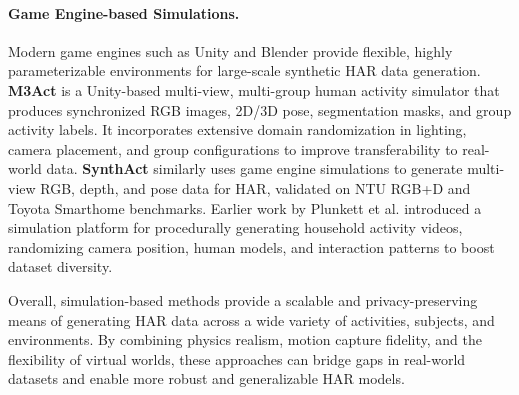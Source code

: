 \paragraph{Game Engine-based Simulations.}
Modern game engines such as Unity and Blender provide flexible, highly parameterizable environments for large-scale synthetic HAR data generation. \textbf{M3Act} \cite{chakma2023domain} is a Unity-based multi-view, multi-group human activity simulator that produces synchronized RGB images, 2D/3D pose, segmentation masks, and group activity labels. It incorporates extensive domain randomization in lighting, camera placement, and group configurations to improve transferability to real-world data. \textbf{SynthAct} \cite{schneider2024synthact} similarly uses game engine simulations to generate multi-view RGB, depth, and pose data for HAR, validated on NTU RGB+D and Toyota Smarthome benchmarks. Earlier work by Plunkett et al. \cite{plunkett2019designing} introduced a simulation platform for procedurally generating household activity videos, randomizing camera position, human models, and interaction patterns to boost dataset diversity.

Overall, simulation-based methods provide a scalable and privacy-preserving means of generating HAR data across a wide variety of activities, subjects, and environments. By combining physics realism, motion capture fidelity, and the flexibility of virtual worlds, these approaches can bridge gaps in real-world datasets and enable more robust and generalizable HAR models.

